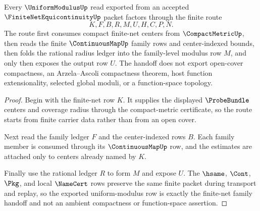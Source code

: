 \begin{theorem}
\label{thm:finite-net-equicontinuity-uniform-modulus-handoff}
Every $\UniformModulusUp$ read exported from an accepted $\FiniteNetEquicontinuityUp$ packet factors through the finite route
$$
K,F,B,R,M,U,H,C,P,N.
$$
The route first consumes compact finite-net centers from $\CompactMetricUp$, then reads the finite $\ContinuousMapUp$ family rows and center-indexed bounds, then folds the rational radius ledger into the family-level modulus row $M$, and only then exposes the output row $U$. The handoff does not export open-cover compactness, an Arzela--Ascoli compactness theorem, host function extensionality, selected global moduli, or a function-space topology.
\end{theorem}
\begin{proof}
Begin with the finite-net row $K$. It supplies the displayed $\ProbeBundle$ centers and coverage radius through the compact-metric certificate, so the route starts from finite carrier data rather than from an open cover.

Next read the family ledger $F$ and the center-indexed rows $B$. Each family member is consumed through its $\ContinuousMapUp$ row, and the estimates are attached only to centers already named by $K$.

Finally use the rational ledger $R$ to form $M$ and expose $U$. The $\hsame$, $\Cont$, $\Pkg$, and local $\NameCert$ rows preserve the same finite packet during transport and replay, so the exported uniform-modulus row is exactly the finite-net family handoff and not an ambient compactness or function-space assertion.
\end{proof}

